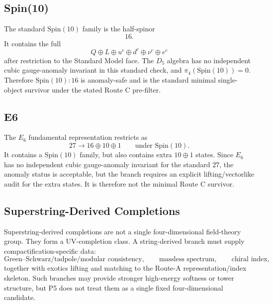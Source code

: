 \documentclass[11pt]{article}
\newcommand{\Spin}{\mathrm{Spin}}
\newcommand{\uc}{u^c}
\newcommand{\dc}{d^c}
\newcommand{\nuc}{\nu^c}
\newcommand{\ec}{e^c}
\begin{document}
\subsection{Spin(10)}

The standard $\Spin(10)$ family is the half-spinor
\begin{equation}
  16.
\end{equation}
It contains the full
\begin{equation}
  Q\oplus L\oplus\uc\oplus\dc\oplus\nuc\oplus\ec
\end{equation}
after restriction to the Standard Model face.  The $D_5$ algebra has no
independent cubic gauge-anomaly invariant in this standard check, and
$\pi_4(\Spin(10))=0$.  Therefore $\Spin(10):16$ is anomaly-safe and is the
standard minimal single-object survivor under the stated Route C
pre-filter.

\subsection{E6}

The $E_6$ fundamental representation restricts as
\begin{equation}
  27\longrightarrow 16\oplus 10\oplus 1
  \qquad \text{under } \Spin(10).
\end{equation}
It contains a $\Spin(10)$ family, but also contains extra $10\oplus 1$
states.  Since $E_6$ has no independent cubic gauge-anomaly invariant for
the standard $27$, the anomaly status is acceptable, but the branch
requires an explicit lifting/vectorlike audit for the extra states.  It is
therefore not the minimal Route C survivor.

\subsection{Superstring-Derived Completions}

Superstring-derived completions are not a single four-dimensional
field-theory group.  They form a UV-completion class.  A string-derived
branch must supply compactification-specific data:
\begin{equation}
  \text{Green--Schwarz/tadpole/modular consistency},
  \qquad
  \text{massless spectrum},
  \qquad
  \text{chiral index},
\end{equation}
together with exotics lifting and matching to the Route-A
representation/index skeleton.  Such branches may provide stronger
high-energy softness or tower structure, but P5 does not treat them as a
single fixed four-dimensional candidate.
\end{document}
